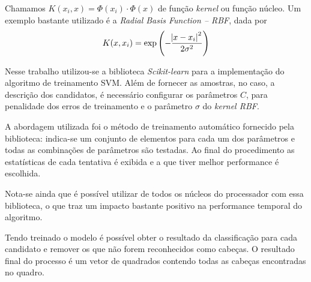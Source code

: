 Chamamos $K(x_i, x) = \Phi(x_i) \cdot \Phi(x)$ de função \textit{kernel} ou função núcleo. Um exemplo bastante utilizado é a \textit{Radial Basis Function -- RBF}, dada por
\begin{equation}
	\label{eq:svm-kernel-func}
	K(x,x_i) = \exp\left(-\frac{\abs{x-x_i}^2}{2\sigma^2}\right)
\end{equation}

Nesse trabalho utilizou-se a biblioteca \textit{Scikit-learn} para a implementação do algoritmo de treinamento SVM. Além de fornecer as amostras, no caso, a descrição dos candidatos, é necessário configurar os parâmetros $C$, para penalidade dos erros de treinamento e o parâmetro $\sigma$ do \textit{kernel RBF}. 

A abordagem utilizada foi o método de treinamento automático fornecido pela biblioteca: indica-se um conjunto de elementos para cada um dos parâmetros e todas as combinações de parâmetros são testadas. Ao final do procedimento as estatísticas de cada tentativa é exibida e a que tiver melhor performance é escolhida.

Nota-se ainda que é possível utilizar de todos os núcleos do processador com essa biblioteca, o que traz um impacto bastante positivo na performance temporal do algoritmo.

Tendo treinado o modelo é possível obter o resultado da classificação para cada candidato e remover os que não forem reconhecidos como cabeças. O resultado final do processo é um vetor de quadrados contendo todas as cabeças encontradas no quadro.

